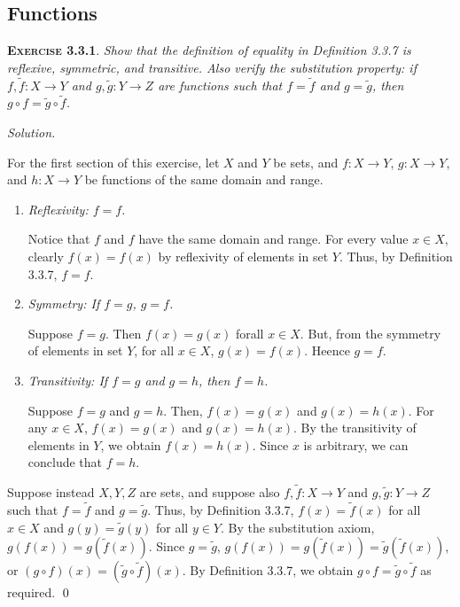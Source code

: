 \documentclass[12pt]{article}
\theoremstyle{remark}
\newenvironment{exer}[2]{
    \noindent \setlength{\parskip}{1em}%
    \textsc{\textbf{Exercise #1}}. \textit{#2} \par
    \noindent \textit{Solution.} %
}{\bigskip}
\begin{document}
\subsection{Functions}
\begin{exer}{3.3.1}{
    Show that the definition of equality in Definition 3.3.7 is reflexive, symmetric, and transitive.
    Also verify the substitution property: if $f, \tilde{f} : X \to Y$ and $g, \tilde{g} : Y \to Z$ are functions such that $f = \tilde{f}$ and $g = \tilde{g}$, then $g \circ f = \tilde{g} \circ \tilde{f}$.
}
    For the first section of this exercise, let $X$ and $Y$ be sets, and $f : X \to Y$, $g : X \to Y$, and $h : X \to Y$ be functions of the same domain and range.

    \begin{enumerate}[topsep=0mm, label=(\alph*)]
        \item \textit{Reflexivity: $f = f$.}
        
            Notice that $f$ and $f$ have the same domain and range.
            For every value $x \in X$, clearly $f(x) = f(x)$ by reflexivity of elements in set $Y$.
            Thus, by Definition 3.3.7, $f = f$.
        
        \item \textit{Symmetry: If $f = g$, $g = f$.}
            
            Suppose $f = g$.
            Then $f(x) = g(x)$ forall $x \in X$.
            But, from the symmetry of elements in set $Y$, for all $x \in X$, $g(x) = f(x)$.
            Heence $g = f$.
        
        \item \textit{Transitivity: If $f = g$ and $g = h$, then $f = h$.}
        
            Suppose $f = g$ and $g = h$.
            Then, $f(x) = g(x)$ and $g(x) = h(x)$.
            For any $x \in X$, $f(x) = g(x)$ and $g(x) = h(x)$.
            By the transitivity of elements in $Y$, we obtain $f(x) = h(x)$.
            Since $x$ is arbitrary, we can conclude that $f = h$.
           
    \end{enumerate}
    
    Suppose instead $X, Y, Z$ are sets, and suppose also $f, \tilde{f} : X \to Y$ and $g, \tilde{g} : Y \to Z$ such that $f = \tilde{f}$ and $g = \tilde{g}$.
    Thus, by Definition 3.3.7, $f(x) = \tilde{f} (x)$ for all $x \in X$ and $g(y) = \tilde{g} (y)$ for all $y \in Y$.
    By the substitution axiom, $g(f(x)) = g(\tilde{f} (x))$.
    Since $g = \tilde{g}$, $g(f(x)) = g(\tilde{f}(x)) = \tilde{g} (\tilde{f} (x))$, or $(g \circ f)(x) = (\tilde{g} \circ \tilde{f})(x).$
    By Definition 3.3.7, we obtain $g \circ f = \tilde{g} \circ \tilde{f}$ as required. \qed
\end{exer}
\end{document}

